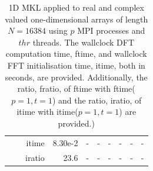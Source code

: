 \documentclass[a4paper]{article}
\begin{document}
\begin{table}[htbp]
\begin{center}
\begin{small}
\begin{tabular}{|r|r|r|r|r|r|r|r|r|r|}
           &          & itime &   8.30e-2 &  - &  - &  - &  - &  - &  - \\
           &          & iratio &   23.6 &  - &  - &  - &  - &  - &  - \\\hline
\end{tabular}
\caption{1D MKL applied to real and complex valued one-dimensional arrays of length $N=16384$ using $p$ MPI processes and $thr$ threads. The wallclock DFT computation time, ftime, and wallclock FFT initialisation time, itime, both in seconds, are provided. Additionally, the ratio, fratio, of ftime  with ftime($p=1,t=1$) and the ratio, iratio, of itime  with itime($p=1,t=1$) are provided.) }\label{Tbl:MKL1d16384}
\end{small}
\end{center}
\end{table}
\end{document}
